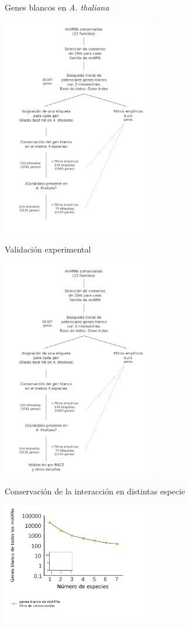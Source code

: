 \documentclass{beamer}
\begin{document}
\begin{frame}{Genes blancos en \textit{A. thaliana}}
	\begin{center}
		\includegraphics[width=0.5\textwidth]{img/NAR_fig1_06.png}
	\end{center}
\end{frame}

\begin{frame}{Validación experimental}
	\begin{center}
		\includegraphics[width=0.5\textwidth]{img/NAR_fig1_07.png}
	\end{center}
\end{frame}

\begin{frame}{Conservación de la interacción en distintas especie}
	\begin{center}
		\includegraphics[width=0.5\textwidth]{img/NAR_fig2_01.png}
	\end{center}
\end{frame}
\end{document}
